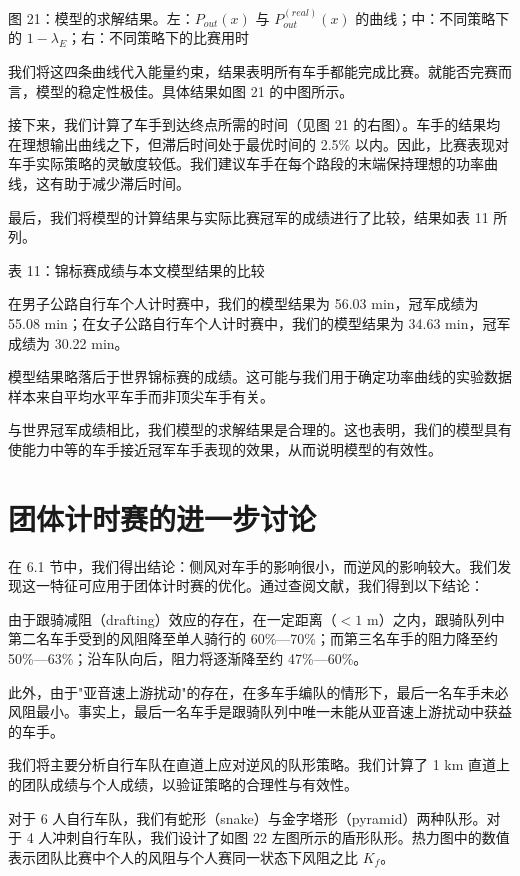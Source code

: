 \documentclass[11pt,a4paper]{ctexart}
\begin{document}
图 21：模型的求解结果。左：$P_{out}(x)$ 与 $P_{out}^{(real)}(x)$ 的曲线；中：不同策略下的 $1-\lambda_E$；右：不同策略下的比赛用时

我们将这四条曲线代入能量约束，结果表明所有车手都能完成比赛。就能否完赛而言，模型的稳定性极佳。具体结果如图 21 的中图所示。

接下来，我们计算了车手到达终点所需的时间（见图 21 的右图）。车手的结果均在理想输出曲线之下，但滞后时间处于最优时间的 2.5\% 以内。因此，比赛表现对车手实际策略的灵敏度较低。我们建议车手在每个路段的末端保持理想的功率曲线，这有助于减少滞后时间。

最后，我们将模型的计算结果与实际比赛冠军的成绩进行了比较，结果如表 11 所列。

表 11：锦标赛成绩与本文模型结果的比较

在男子公路自行车个人计时赛中，我们的模型结果为 56.03 min，冠军成绩为 55.08 min；在女子公路自行车个人计时赛中，我们的模型结果为 34.63 min，冠军成绩为 30.22 min。

模型结果略落后于世界锦标赛的成绩。这可能与我们用于确定功率曲线的实验数据样本来自平均水平车手而非顶尖车手有关。

与世界冠军成绩相比，我们模型的求解结果是合理的。这也表明，我们的模型具有使能力中等的车手接近冠军车手表现的效果，从而说明模型的有效性。

\section{团体计时赛的进一步讨论}

在 6.1 节中，我们得出结论：侧风对车手的影响很小，而逆风的影响较大。我们发现这一特征可应用于团体计时赛的优化。通过查阅文献，我们得到以下结论：

由于跟骑减阻（drafting）效应的存在，在一定距离（$<1$ m）之内，跟骑队列中第二名车手受到的风阻降至单人骑行的 60\%—70\%；而第三名车手的阻力降至约 50\%—63\%；沿车队向后，阻力将逐渐降至约 47\%—60\%。

此外，由于"亚音速上游扰动"的存在，在多车手编队的情形下，最后一名车手未必风阻最小。事实上，最后一名车手是跟骑队列中唯一未能从亚音速上游扰动中获益的车手。

我们将主要分析自行车队在直道上应对逆风的队形策略。我们计算了 1 km 直道上的团队成绩与个人成绩，以验证策略的合理性与有效性。

对于 6 人自行车队，我们有蛇形（snake）与金字塔形（pyramid）两种队形。对于 4 人冲刺自行车队，我们设计了如图 22 左图所示的盾形队形。热力图中的数值表示团队比赛中个人的风阻与个人赛同一状态下风阻之比 $K_f$。
\end{document}
